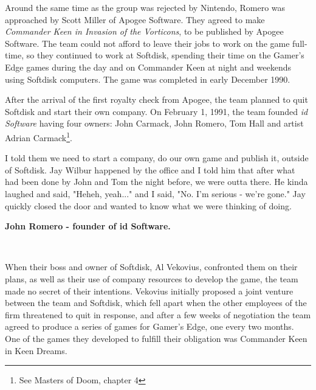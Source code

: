 \documentclass[book.tex]{subfiles}
\begin{document}
\label{sec:id_software}
Around the same time as the group was rejected by Nintendo, Romero was approached by Scott Miller of Apogee Software. They agreed to make \textit{Commander Keen in Invasion of the Vorticons}, to be published by Apogee Software. The team could not afford to leave their jobs to work on the game full-time, so they continued to work at Softdisk, spending their time on the Gamer's Edge games during the day and on Commander Keen at night and weekends using Softdisk computers. The game was completed in early December 1990.\\

\par
After the arrival of the first royalty check from Apogee, the team planned to quit Softdisk and start their own company. On February 1, 1991, the team founded \textit{id Software} having four owners: John Carmack, John Romero, Tom Hall and artist Adrian Carmack\footnote{See Masters of Doom, chapter 4}. \\

\par
\begin{fancyquotes}
I told them we need to start a company, do our own game and publish it, outside of Softdisk. Jay Wilbur happened by the office and I told him that after what had been done by John and Tom the night before, we were outta there. He kinda laughed and said, "Heheh, yeah..." and I said, "No. I'm serious - we're gone." Jay quickly closed the door and wanted to know what we were thinking of doing.\\
\par
\textbf{John Romero - founder of id Software.}
\end{fancyquotes}\\
\par


When their boss and owner of Softdisk, Al Vekovius, confronted them on their plans, as well as their use of company resources to develop the game, the team made no secret of their intentions. Vekovius initially proposed a joint venture between the team and Softdisk, which fell apart when the other employees of the firm threatened to quit in response, and after a few weeks of negotiation the team agreed to produce a series of games for Gamer's Edge, one every two months. One of the games they developed to fulfill their obligation was Commander Keen in Keen Dreams.\\
\par
\end{document}

